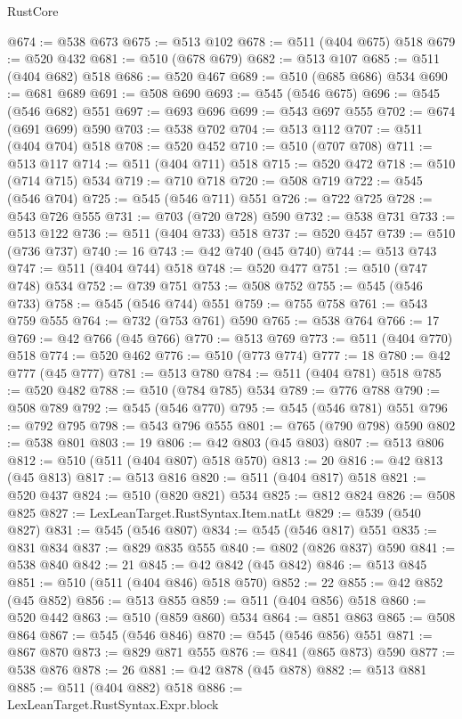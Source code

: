 \begin{lexlean}{RustCore}
\begin{coremodule}
@674 := @538 @673
@675 := @513 @102
@678 := @511 (@404 @675) @518
@679 := @520 @432
@681 := @510 (@678 @679)
@682 := @513 @107
@685 := @511 (@404 @682) @518
@686 := @520 @467
@689 := @510 (@685 @686) @534
@690 := @681 @689
@691 := @508 @690
@693 := @545 (@546 @675)
@696 := @545 (@546 @682) @551
@697 := @693 @696
@699 := @543 @697 @555
@702 := @674 (@691 @699) @590
@703 := @538 @702
@704 := @513 @112
@707 := @511 (@404 @704) @518
@708 := @520 @452
@710 := @510 (@707 @708)
@711 := @513 @117
@714 := @511 (@404 @711) @518
@715 := @520 @472
@718 := @510 (@714 @715) @534
@719 := @710 @718
@720 := @508 @719
@722 := @545 (@546 @704)
@725 := @545 (@546 @711) @551
@726 := @722 @725
@728 := @543 @726 @555
@731 := @703 (@720 @728) @590
@732 := @538 @731
@733 := @513 @122
@736 := @511 (@404 @733) @518
@737 := @520 @457
@739 := @510 (@736 @737)
@740 := 16
@743 := @42 @740 (@45 @740)
@744 := @513 @743
@747 := @511 (@404 @744) @518
@748 := @520 @477
@751 := @510 (@747 @748) @534
@752 := @739 @751
@753 := @508 @752
@755 := @545 (@546 @733)
@758 := @545 (@546 @744) @551
@759 := @755 @758
@761 := @543 @759 @555
@764 := @732 (@753 @761) @590
@765 := @538 @764
@766 := 17
@769 := @42 @766 (@45 @766)
@770 := @513 @769
@773 := @511 (@404 @770) @518
@774 := @520 @462
@776 := @510 (@773 @774)
@777 := 18
@780 := @42 @777 (@45 @777)
@781 := @513 @780
@784 := @511 (@404 @781) @518
@785 := @520 @482
@788 := @510 (@784 @785) @534
@789 := @776 @788
@790 := @508 @789
@792 := @545 (@546 @770)
@795 := @545 (@546 @781) @551
@796 := @792 @795
@798 := @543 @796 @555
@801 := @765 (@790 @798) @590
@802 := @538 @801
@803 := 19
@806 := @42 @803 (@45 @803)
@807 := @513 @806
@812 := @510 (@511 (@404 @807) @518 @570)
@813 := 20
@816 := @42 @813 (@45 @813)
@817 := @513 @816
@820 := @511 (@404 @817) @518
@821 := @520 @437
@824 := @510 (@820 @821) @534
@825 := @812 @824
@826 := @508 @825
@827 := LexLeanTarget.RustSyntax.Item.natLt
@829 := @539 (@540 @827)
@831 := @545 (@546 @807)
@834 := @545 (@546 @817) @551
@835 := @831 @834
@837 := @829 @835 @555
@840 := @802 (@826 @837) @590
@841 := @538 @840
@842 := 21
@845 := @42 @842 (@45 @842)
@846 := @513 @845
@851 := @510 (@511 (@404 @846) @518 @570)
@852 := 22
@855 := @42 @852 (@45 @852)
@856 := @513 @855
@859 := @511 (@404 @856) @518
@860 := @520 @442
@863 := @510 (@859 @860) @534
@864 := @851 @863
@865 := @508 @864
@867 := @545 (@546 @846)
@870 := @545 (@546 @856) @551
@871 := @867 @870
@873 := @829 @871 @555
@876 := @841 (@865 @873) @590
@877 := @538 @876
@878 := 26
@881 := @42 @878 (@45 @878)
@882 := @513 @881
@885 := @511 (@404 @882) @518
@886 := LexLeanTarget.RustSyntax.Expr.block

\end{coremodule}
\end{lexlean}
